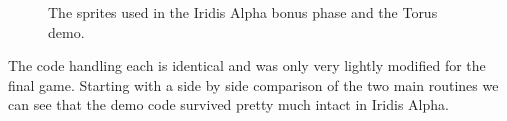 \begin{figure}[H]
  {
    \setlength{\tabcolsep}{3.0pt}
    \setlength\cmidrulewidth{\heavyrulewidth} %
	\centering
	\def\MULTICOLORONE{red}
	\def\MULTICOLORTWO{white}
	\def\SPRITECOLOR{blue}
	\begin{subfigure}{0.5\textwidth}
		
	\end{subfigure}
	\def\MULTICOLORONE{yellow}
	\def\MULTICOLORTWO{red}
	\def\SPRITECOLOR{c64_purple}
	\begin{subfigure}{0.5\textwidth}
		
	\end{subfigure}
}\caption[position=top]{The sprites used in the Iridis Alpha bonus phase and the Torus demo.}
\end{figure}

The code handling each is identical and was only very lightly modified for the final game.
Starting with a side by side comparison of the two main routines we can see that the demo
code survived pretty much intact in Iridis Alpha.


